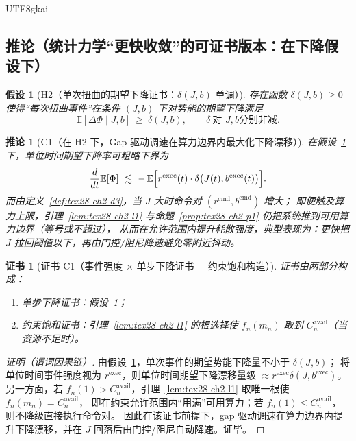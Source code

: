 \documentclass[12pt]{article}
\newtheorem{assumption}{假设}[section]
\newtheorem{corollary}{推论}[section]
\newtheorem{Certificate}{证书}[section]
\begin{document}
\begin{CJK*}{UTF8}{gkai}
\subsection{推论（统计力学“更快收敛”的可证书版本：在下降假设下）}
\label{subsec:tex28-ch2-corollaries}

\begin{assumption}[H2（单次扭曲的期望下降证书：$\delta(J,b)$ 单调）]
\label{assu:tex28-ch2-h2}
存在函数 $\delta(J,b)\ge 0$ 使得“每次扭曲事件”在条件 $(J,b)$ 下对势能的期望下降满足
\[
  \mathbb{E}[\Delta\Phi\mid J,b]\ \ge\ \delta(J,b),
  \qquad
  \delta\ \text{对 }J,b\text{分别非减}.
\]
\end{assumption}

\begin{corollary}[C1（在 H2 下，Gap 驱动调速在算力边界内最大化下降漂移）]
\label{cor:tex28-ch2-c1}
在假设~\ref{assu:tex28-ch2-h2} 下，单位时间期望下降率可粗略下界为
\[
  \frac{d}{dt}\mathbb{E}[\Phi]\ \lesssim\ -\,\mathbb{E}\Bigl[r^{\mathrm{exec}}(t)\cdot \delta\bigl(J(t),b^{\mathrm{exec}}
    (t)\bigr)\Bigr].
\]
而由定义~\ref{def:tex28-ch2-d3}，当 $J$ 大时命令对 $(r^{\mathrm{cmd}},b^{\mathrm{cmd}})$ 增大；
即便触及算力上限，引理~\ref{lem:tex28-ch2-l1} 与命题~\ref{prop:tex28-ch2-p1} 仍把系统推到可用算力边界（等号或不超过），
从而在允许范围内提升耗散强度，典型表现为：更快把 $J$ 拉回阈值以下，再由门控/阻尼降速避免零附近抖动。
\end{corollary}

\begin{Certificate}[证书 C1（事件强度 × 单步下降证书 + 约束饱和构造）]
\label{cert:tex28-ch2-c1}
证书由两部分构成：
\begin{enumerate}
  \item 单步下降证书：假设~\ref{assu:tex28-ch2-h2}；
  \item 约束饱和证书：引理~\ref{lem:tex28-ch2-l1} 的根选择使 $f_n(m_n)$ 取到 $C^{\mathrm{avail}}_n$（当资源不足时）。
\end{enumerate}
\end{Certificate}

\begin{proof}[证明（谓词因果链）]
由假设~\ref{assu:tex28-ch2-h2}，单次事件的期望势能下降量不小于 $\delta(J,b)$；
将单位时间事件强度视为 $r^{\mathrm{exec}}$，则单位时间期望下降漂移量级 $\approx r^{\mathrm{exec}}\delta(J,b^{\mathrm{exec}})$。
另一方面，若 $f_n(1)>C^{\mathrm{avail}}_n$，引理~\ref{lem:tex28-ch2-l1} 取唯一根使 $f_n(m_n)=C^{\mathrm{avail}}_n$，
即在约束允许范围内“用满”可用算力；若 $f_n(1)\le C^{\mathrm{avail}}_n$，则不降级直接执行命令对。
因此在该证书前提下，gap 驱动调速在算力边界内提升下降漂移，并在 $J$ 回落后由门控/阻尼自动降速。证毕。
\end{proof}


\end{CJK*}
\end{document}

